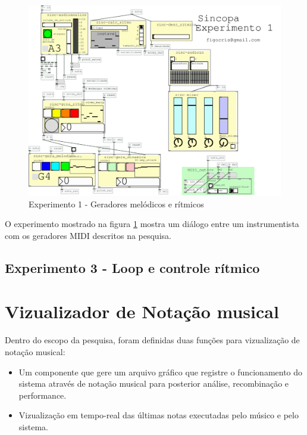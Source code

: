 \documentclass{ppgmus}
\begin{document}
\begin{figure}
\includegraphics[scale=.4]{experimento1}
\caption{Experimento 1 - Geradores melódicos e rítmicos}
\label{experimento1}
\end{figure}


O experimento mostrado na figura \ref{experimento1} mostra um diálogo
entre um instrumentista com os geradores MIDI descritos na pesquisa.




\subsection{Experimento 3 - Loop e controle rítmico}













\section{Vizualizador de Notação musical}
\label{sec-notacao}



Dentro do escopo da pesquisa, foram definidas duas funções
para vizualização de notação musical:

\begin{itemize}
 \item Um componente que gere um arquivo gráfico que registre o funcionamento
do sistema através de notação musical para posterior análise, recombinação e performance.
 \item Vizualização em tempo-real das últimas notas executadas pelo músico e pelo sistema.
\end{itemize}
\end{document}
